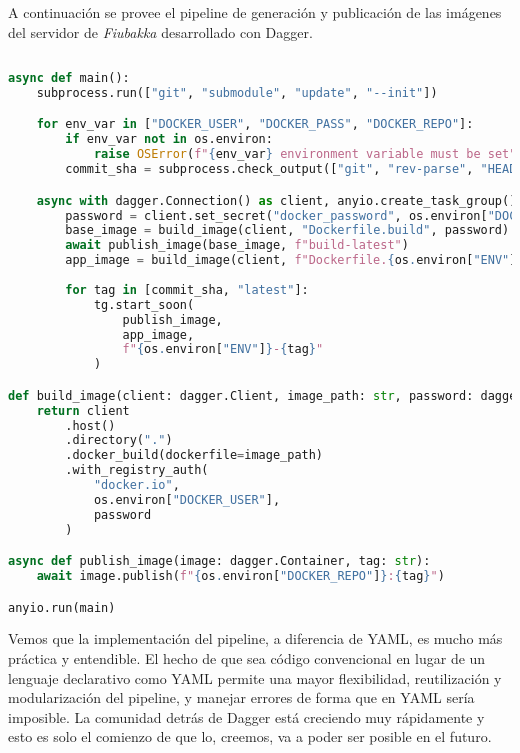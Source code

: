 A continuación se provee el pipeline de generación y publicación de las imágenes del servidor de \textit{Fiubakka} desarrollado con Dagger.

\begin{lstlisting}[language=Python]
    
async def main():
    subprocess.run(["git", "submodule", "update", "--init"])

    for env_var in ["DOCKER_USER", "DOCKER_PASS", "DOCKER_REPO"]:
        if env_var not in os.environ:
            raise OSError(f"{env_var} environment variable must be set")
        commit_sha = subprocess.check_output(["git", "rev-parse", "HEAD"]).strip().decode("utf-8")[:7]

    async with dagger.Connection() as client, anyio.create_task_group() as tg:
        password = client.set_secret("docker_password", os.environ["DOCKER_PASS"])
        base_image = build_image(client, "Dockerfile.build", password)
        await publish_image(base_image, f"build-latest")
        app_image = build_image(client, f"Dockerfile.{os.environ["ENV"]}", password)
        
        for tag in [commit_sha, "latest"]:
            tg.start_soon(
                publish_image,
                app_image,
                f"{os.environ["ENV"]}-{tag}"
            )

def build_image(client: dagger.Client, image_path: str, password: dagger.Secret):
    return client
        .host()
        .directory(".")
        .docker_build(dockerfile=image_path)
        .with_registry_auth(
            "docker.io",
            os.environ["DOCKER_USER"],
            password
        )

async def publish_image(image: dagger.Container, tag: str):
    await image.publish(f"{os.environ["DOCKER_REPO"]}:{tag}")

anyio.run(main)

\end{lstlisting}

Vemos que la implementación del pipeline, a diferencia de YAML, es mucho más práctica y entendible. El hecho de que sea código convencional
en lugar de un lenguaje declarativo como YAML permite una mayor flexibilidad, reutilización y modularización del pipeline, y manejar errores de forma que en YAML
sería imposible. La comunidad detrás de Dagger está creciendo muy rápidamente y esto es solo el comienzo de que lo, creemos, va a poder ser posible en el futuro.
